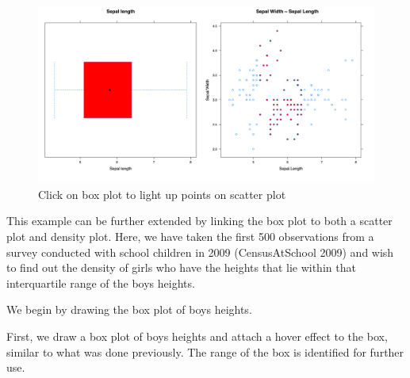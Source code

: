 \documentclass[11pt,]{report}
\newenvironment{Shaded}{\begin{snugshade}}{\end{snugshade}}
\newcommand{\KeywordTok}[1]{\textcolor[rgb]{0.13,0.29,0.53}{\textbf{#1}}}
\newcommand{\DataTypeTok}[1]{\textcolor[rgb]{0.13,0.29,0.53}{#1}}
\newcommand{\StringTok}[1]{\textcolor[rgb]{0.31,0.60,0.02}{#1}}
\newcommand{\OtherTok}[1]{\textcolor[rgb]{0.56,0.35,0.01}{#1}}
\newcommand{\OperatorTok}[1]{\textcolor[rgb]{0.81,0.36,0.00}{\textbf{#1}}}
\newcommand{\NormalTok}[1]{#1}
\begin{document}
\begin{figure}[H]

{\centering \includegraphics[width=0.7\linewidth,]{./fig/int-bp-3} 

}

\caption{\label{fig:int-bp-3} Click on box plot to light up points on scatter plot}\label{fig:unnamed-chunk-57}
\end{figure}

This example can be further extended by linking the box plot to both a
scatter plot and density plot. Here, we have taken the first 500
observations from a survey conducted with school children in 2009
(CensusAtSchool 2009) and wish to find out the density of girls who have
the heights that lie within that interquartile range of the boys
heights.

We begin by drawing the box plot of boys heights.

First, we draw a box plot of boys heights and attach a hover effect to
the box, similar to what was done previously. The range of the box is
identified for further use.

\begin{Shaded}
\end{Shaded}
\end{document}
